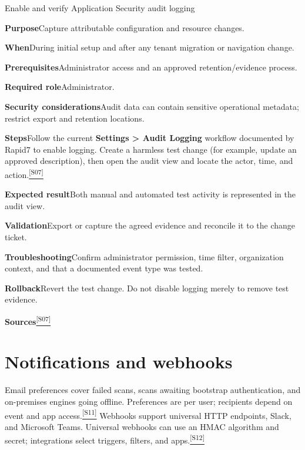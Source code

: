 \documentclass[11pt,letterpaper,oneside]{scrreprt}
\newcommand{\src}[1]{\hyperref[src:#1]{\textsuperscript{\color{R7Orange}[#1]}}}
\newcommand{\uipath}[1]{\textsf{\textbf{#1}}}
\newcommand{\field}[1]{\par\smallskip\noindent\textbf{#1}\quad}
\begin{document}
\begin{procedure}{Enable and verify Application Security audit logging}
\field{Purpose}Capture attributable configuration and resource changes.
\field{When}During initial setup and after any tenant migration or navigation change.
\field{Prerequisites}Administrator access and an approved retention/evidence process.
\field{Required role}Administrator.
\field{Security considerations}Audit data can contain sensitive operational metadata; restrict export and retention locations.
\field{Steps}Follow the current \uipath{Settings > Audit Logging} workflow documented by Rapid7 to enable logging. Create a harmless test change (for example, update an approved description), then open the audit view and locate the actor, time, and action.\src{S07}
\field{Expected result}Both manual and automated test activity is represented in the audit view.
\field{Validation}Export or capture the agreed evidence and reconcile it to the change ticket.
\field{Troubleshooting}Confirm administrator permission, time filter, organization context, and that a documented event type was tested.
\field{Rollback}Revert the test change. Do not disable logging merely to remove test evidence.
\field{Sources}\src{S07}
\end{procedure}

\section{Notifications and webhooks}
Email preferences cover failed scans, scans awaiting bootstrap authentication, and on-premises engines going offline. Preferences are per user; recipients depend on event and app access.\src{S11} Webhooks support universal HTTP endpoints, Slack, and Microsoft Teams. Universal webhooks can use an HMAC algorithm and secret; integrations select triggers, filters, and apps.\src{S12}
\end{document}
